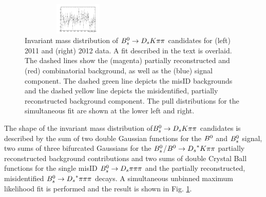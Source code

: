 \begin{figure}[h]
\includegraphics[width=0.49\textwidth,height=1.5cm]{figs/pull_sim12.pdf}
\caption{Invariant mass distribution of ${{B}^0_{s}}\rightarrow{\ensuremath{{D}_{s}}}{\ensuremath{K}}{\ensuremath{\pi}}{\ensuremath{\pi}}$ candidates for (left) 2011 and (right) 2012 data.
A fit described in the text is overlaid. The dashed lines show the (magenta) partially reconstructed and (red) combinatorial background, as well as the (blue) signal component. 
The dashed green line depicts the misID backgrounds and the dashed yellow line depicts the misidentified, partially reconstructed background component. 
The pull distributions for the simultaneous fit are shown at the lower left and right.}
\label{fig: BsDsKpipiFit}
\end{figure}

The shape of the invariant mass distribution of${{B}^0_{s}}\rightarrow{\ensuremath{{D}_{s}}}{\ensuremath{K}}{\ensuremath{\pi}}{\ensuremath{\pi}}$ candidates is described by the sum of two double Gaussian functions for the ${{B}^0}$ and ${{B}^0_{s}}$ signal, 
two sums of three bifurcated Gaussians for the ${{B}^0_{s}}$/${{B}^0}\rightarrow{\ensuremath{{D}_{s}}}^{*}{K}{\pi}{\pi}$ partially reconstructed background contributions and 
two sums of double Crystal Ball functions for the single misID ${{B}^0_{s}}\rightarrow{\ensuremath{{D}_{s}}}{\ensuremath{\pi}}{\ensuremath{\pi}}{\ensuremath{\pi}}$ and the partially reconstructed, misidentified ${{B}^0_{s}}\rightarrow{\ensuremath{{D}_{s}}}^{*}{\pi}{\pi}{\pi}$ decays. 
A simultaneous unbinned maximum likelihood fit is performed and the result is shown in Fig. \ref{fig: BsDsKpipiFit}.
 

